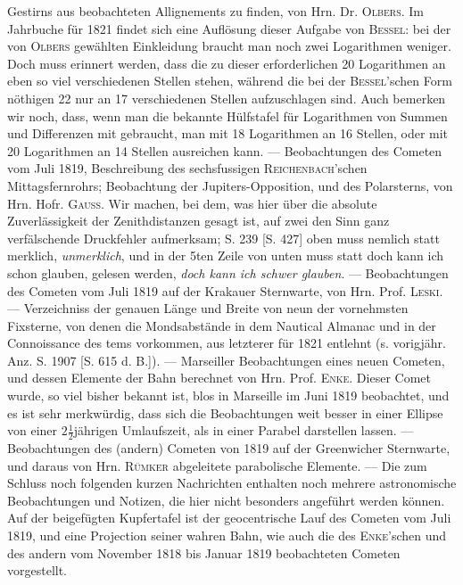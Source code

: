 Gestirns aus beobachteten Allignements zu finden, von Hrn. Dr. \textsc{Olbers}. Im Jahrbuche für 1821 findet sich eine Auflösung dieser Aufgabe von \textsc{Bessel}: bei der von \textsc{Olbers} gewählten Einkleidung braucht man noch zwei Logarithmen weniger. Doch muss erinnert werden, dass die zu dieser erforderlichen 20 Logarithmen an eben so viel verschiedenen Stellen stehen, während die bei der \textsc{Bessel}'schen Form nöthigen 22 nur an 17 verschiedenen Stellen aufzuschlagen sind. Auch bemerken wir noch, dass, wenn man die bekannte Hülfstafel für Logarithmen von Summen und Differenzen mit gebraucht, man mit 18 Logarithmen an 16 Stellen, oder mit 20 Logarithmen an 14 Stellen ausreichen kann. --- Beobachtungen des Cometen vom Juli 1819, Beschreibung des sechsfussigen \textsc{Reichenbach}'schen Mittagsfernrohrs; Beobachtung der Jupiters-Opposition, und des Polarsterns, von Hrn. Hofr. \textsc{Gauss}. Wir machen, bei dem, was hier über die absolute Zuverlässigkeit der Zenithdistanzen gesagt ist, auf zwei den Sinn ganz verfälschende Druckfehler aufmerksam; S. 239 [S. 427] oben muss nemlich statt merklich, \emph{unmerklich}, und in der 5ten Zeile von unten muss statt doch kann ich schon glauben, gelesen werden, \emph{doch kann ich schwer glauben}. --- Beobachtungen des Cometen vom Juli 1819 auf der Krakauer Sternwarte, von Hrn. Prof. \textsc{Leski}. --- Verzeichniss der genauen Länge und Breite von neun der vornehmsten Fixsterne, von denen die Mondsabstände in dem Nautical Almanac und in der Connoissance des tems vorkommen, aus letzterer für 1821 entlehnt (s. vorigjähr. Anz. S. 1907 [S. 615 d. B.]). --- Marseiller Beobachtungen eines neuen Cometen, und dessen Elemente der Bahn berechnet von Hrn. Prof. \textsc{Enke}. Dieser Comet wurde, so viel bisher bekannt ist, blos in Marseille im Juni 1819 beobachtet, und es ist sehr merkwürdig, dass sich die Beobachtungen weit besser in einer Ellipse von einer $2\frac{1}{2}$jährigen 
Umlaufszeit, als in einer Parabel darstellen lassen. --- Beobachtungen des (andern) Cometen von 1819 auf der Greenwicher Sternwarte, und daraus von Hrn. \textsc{Rümker} abgeleitete parabolische Elemente. --- Die zum Schluss noch folgenden kurzen Nachrichten enthalten noch mehrere astronomische Beobachtungen und Notizen, die hier nicht besonders angeführt werden können. Auf der beigefügten Kupfertafel ist der geocentrische Lauf des Cometen vom Juli 1819, und eine Projection seiner wahren Bahn, wie auch die des \textsc{Enke}'schen und des andern vom November 1818 bis Januar 1819 beobachteten Cometen vorgestellt.
